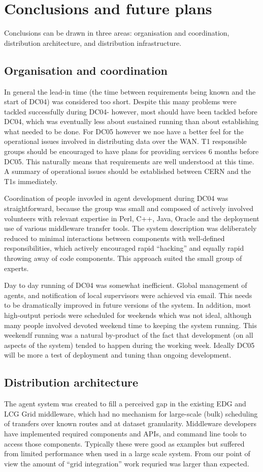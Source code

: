 \documentclass{cmspaper}
\begin{document}
\section{Conclusions and future plans}
Conclusions can be drawn in three areas: organisation and coordination, distribution 
architecture, and distribution infrastructure.

\subsection{Organisation and coordination}
In general the lead-in time (the time between requirements being known and the start of
DC04) was considered too short. Despite this many problems were tackled successfully 
during DC04- however, most should have been tackled before DC04, which was eventually less
about sustained running than about establishing what needed to be done. For DC05 however
we noe have a better feel for the operational issues involved in distributing data over
the WAN. T1 responsible groups should be encouraged to have plans for providing services 
6 months before DC05. This naturally means that requirements are well understood at this 
time. A summary of operational issues should be established between CERN and the T1s
immediately.

Coordination of people invovled in agent development during DC04 was straightforward, 
because the group was small and composed of actively involved volunteers with relevant 
expertise in Perl, C++, Java, Oracle and the deployment use of various middleware 
transfer tools. The system description was deliberately reduced to minimal interactions
between components with well-defined responsibilities, which actively encouraged rapid
``hacking'' and equally rapid throwing away of code components. This approach suited the 
small group of experts.

Day to day running of DC04 was somewhat inefficient. Global management of agents, and 
notification of local supervisors were achieved via email. This needs to be dramatically
improved in future versions of the system. In addition, most high-output periods were
scheduled for weekends which was not ideal, although many people involved devoted weekend
time to keeping the system running. This weekendf running was a natural by-product of the 
fact that development (on all aspects of the system) tended to happen during the working
week. Ideally DC05 will be more a test of deployment and tuning than ongoing 
development.

\subsection{Distribution architecture}
The agent system was created to fill a perceived gap in the existing EDG and LCG Grid 
middleware, which had no mechanism for large-scale (bulk) scheduling of transfers over 
known routes and at dataset granularity. Middleware developers have implemented required
components and APIs, and command line tools to access those components. Typically these
were good as examples but suffered from limited performance when used in a large scale 
system. From our point of view the amount of ``grid integration'' work requried was larger
than expected.
\end{document}
